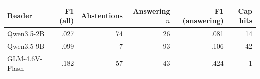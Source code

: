\begin{tabular}{lrrrrr}
\toprule
Reader & F1 (all) & Abstentions & Answering $n$ & F1 (answering) & Cap hits \\
\midrule
Qwen3.5-2B & .027 & 74 & 26 & .081 & 14 \\
Qwen3.5-9B & .099 & 7 & 93 & .106 & 42 \\
GLM-4.6V-Flash & .182 & 57 & 43 & .424 & 1 \\
\bottomrule
\end{tabular}
